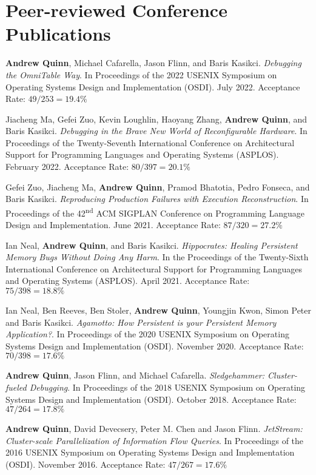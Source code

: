 \documentclass[letterpaper,10pt]{article}
\newcommand{\paper}[3]{#1. #2 #3}
\begin{document}
\section{Peer-reviewed Conference Publications}
\begin{smenumerate}
\item \paper{\textbf{Andrew Quinn}, Michael Cafarella, Jason Flinn,
  and Baris Kasikci}{\emph{Debugging the OmniTable Way}.  In
  Proceedings of the 2022 USENIX Symposium on Operating Systems Design
  and Implementation (OSDI).  July 2022.}{Acceptance Rate:
  $49/253=19.4\%$}
      
\item \paper{Jiacheng Ma, Gefei Zuo, Kevin Loughlin, Haoyang Zhang,
  \textbf{Andrew Quinn}, and Baris Kasikci}{\emph{Debugging in the
  Brave New World of Reconfigurable Hardware}. In Proceedings of the
  Twenty-Seventh International Conference on Architectural Support for
  Programming Languages and Operating Systems (ASPLOS). February
  2022.}{Acceptance Rate: $80/397=20.1\%$}

  \item \paper{Gefei Zuo, Jiacheng Ma, \textbf{Andrew Quinn}, Pramod
    Bhatotia, Pedro Fonseca, and Baris Kasikci}{\emph{Reproducing
    Production Failures with Execution Reconstruction}. In Proceedings
    of the 42\textsuperscript{nd} ACM SIGPLAN Conference on
    Programming Language Design and Implementation. June
    2021.}{Acceptance Rate: $87/320=27.2\%$}

  \item \paper{Ian Neal, \textbf{Andrew Quinn}, and Baris
    Kasikci}{\emph{Hippocrates: Healing Persistent Memory Bugs Without
    Doing Any Harm}. In the Proceedings of the Twenty-Sixth
    International Conference on Architectural Support for Programming
    Languages and Operating Systems (ASPLOS). April 2021.}{Acceptance
    Rate: $75/398=18.8\%$}
    
  \item \paper{Ian Neal, Ben Reeves, Ben Stoler, \textbf{Andrew Quinn}, Youngjin Kwon,
    Simon Peter and Baris Kasikci}{\emph{Agamotto: How Persistent is your
    Persistent Memory Application?}.  In Proceedings of the 2020 USENIX
    Symposium on Operating Systems Design and Implementation (OSDI).  November
    2020.}{Acceptance Rate: $70/398=17.6\%$}

  \item \paper{\textbf{Andrew Quinn}, Jason Flinn, and Michael Cafarella}{
    \emph{Sledgehammer: Cluster-fueled Debugging}.  In Proceedings of the 2018
    USENIX Symposium on Operating Systems Design and Implementation (OSDI).
    October 2018.}{Acceptance Rate: $47/264 = 17.8\%$}

  \item \paper{\textbf{Andrew Quinn}, David Devecsery, Peter M. Chen and Jason
    Flinn}{\emph{JetStream: Cluster-scale Parallelization of Information
    Flow Queries}.  In Proceedings of the 2016 USENIX Symposium on
    Operating Systems Design and Implementation (OSDI). November
    2016.}{Acceptance Rate: $47/267=17.6\%$}
\end{smenumerate}
\end{document}
